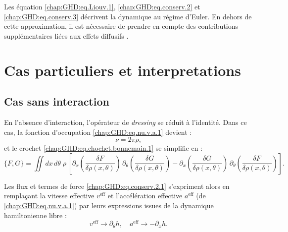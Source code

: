 Les équation \eqref{chap:GHD:eq.Liouv.1},  \eqref{chap:GHD:eq.conserv.2} et \eqref{chap:GHD:eq.conserv.3} décrivent la dynamique au régime d’Euler. En dehors de cette approximation, il est nécessaire de prendre en compte des contributions supplémentaires liées aux effets diffusifs \cite{DeNardis2018}.




\section{Cas particuliers et interpretations}


\subsection{Cas sans interaction}

En l’absence d’interaction, l’opérateur de \emph{dressing} se réduit à l’identité.  
Dans ce cas, la fonction d’occupation \eqref{chap:GHD:eq.nu.v.a.1} devient :
\begin{equation}
	\nu = 2\pi \rho,
\end{equation}
et le crochet \eqref{chap:GHD:eq.chochet.bonnemain.1} se simplifie en :
\begin{equation}
	\{F,G\} = \iint dx\,d\theta\;\rho \,\left[\partial_x \!\left( \frac{\delta F}{\delta \rho (x , \theta)} \right)\, \partial_\theta \!\left( \frac{\delta G}{\delta \rho (x , \theta)} \right) - \partial_x \!\left( \frac{\delta G}{\delta \rho (x , \theta)} \right) \, \partial_\theta \!\left( \frac{\delta F}{\delta \rho(x , \theta) } \right) \right].
\end{equation}

Les flux et termes de force \eqref{chap:GHD:eq.conserv.2.1} s’expriment alors en remplaçant la vitesse effective $v^{\mathrm{eff}}$ et l’accélération effective $a^{\mathrm{eff}}$ (de \eqref{chap:GHD:eq.nu.v.a.1}) par leurs expressions issues de la dynamique hamiltonienne libre :
\begin{equation}
	v^{\mathrm{eff}} \to \partial_\theta h, 
	\quad a^{\mathrm{eff}} \to  -\partial_x h.
\end{equation}

